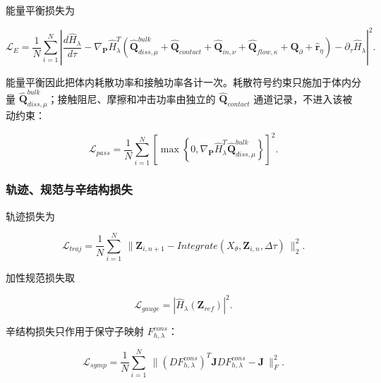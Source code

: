 能量平衡损失为

\begin{equation}
\label{eq:chnn-4-26}
\mathcal{L}_{E} = \frac{1}{N}\sum_{i = 1}^{N}\left| \frac{d{\widehat{H}}_{\lambda}}{d\tau} - \nabla_{\mathbf{P}}{\widehat{H}}_{\lambda}^{T}\left( {\widehat{\mathbf{Q}}}_{diss,\mu}^{bulk} + {\widehat{\mathbf{Q}}}_{contact} + {\widehat{\mathbf{Q}}}_{in,\nu} + {\widehat{\mathbf{Q}}}_{flow,\kappa} + \mathbf{Q}_{\partial} + {\widehat{\mathbf{r}}}_{\eta} \right) - \partial_{\tau}{\widehat{H}}_{\lambda} \right|^{2}.
\end{equation}

能量平衡因此把体内耗散功率和接触功率各计一次。耗散符号约束只施加于体内分量 \({\widehat{\mathbf{Q}}}_{diss,\mu}^{bulk}\)；接触阻尼、摩擦和冲击功率由独立的 \({\widehat{\mathbf{Q}}}_{contact}\) 通道记录，不进入该被动约束：

\begin{equation}
\label{eq:chnn-4-27}
\mathcal{L}_{pass} = \frac{1}{N}\sum_{i = 1}^{N}\left\lbrack \max\left\{ 0,\nabla_{\mathbf{P}}{\widehat{H}}_{\lambda}^{T}{\widehat{\mathbf{Q}}}_{diss,\mu}^{bulk} \right\} \right\rbrack^{2}.
\end{equation}

\subsubsection{轨迹、规范与辛结构损失}\label{sec:chnn-4-5-3}

轨迹损失为

\begin{equation}
\label{eq:chnn-4-28}
\mathcal{L}_{traj} = \frac{1}{N}\sum_{i = 1}^{N}\left. \  \parallel \mathbf{Z}_{i,n + 1} - Integrate\left( X_{\theta},\mathbf{Z}_{i,n},\Delta\tau \right) \right.\  \parallel_{2}^{2}.
\end{equation}

加性规范损失取

\begin{equation}
\label{eq:chnn-4-29}
\mathcal{L}_{gauge} = \left| {\widehat{H}}_{\lambda}\left( \mathbf{Z}_{ref} \right) \right|^{2}.
\end{equation}

辛结构损失只作用于保守子映射 \(F_{h,\lambda}^{cons}\)：

\begin{equation}
\label{eq:chnn-4-30}
\mathcal{L}_{symp} = \frac{1}{N}\sum_{i = 1}^{N}\left. \  \parallel \left( DF_{h,\lambda}^{cons} \right)^{T}\mathbf{J}DF_{h,\lambda}^{cons} - \mathbf{J} \right.\  \parallel_{F}^{2}.
\end{equation}

